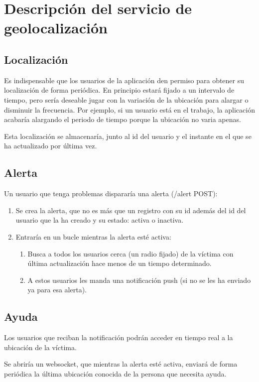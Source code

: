 \chapter{Descripción del servicio de geolocalización}

\section{Localización}
Es indispensable que los usuarios de la aplicación den permiso para obtener su localización de forma periódica. En principio estará fijado a un intervalo de tiempo, pero sería deseable 
jugar con la variación de la ubicación para alargar o disminuir la frecuencia. Por ejemplo, si un usuario está en el trabajo, la aplicación acabaría alargando el periodo de tiempo porque la ubicación no varia apenas. 

Esta localización se almacenaría, junto al id del usuario y el instante en el que se ha actualizado por última vez.

\section{Alerta}

Un usuario que tenga problemas dispararía una alerta (/alert POST):

\begin{enumerate}
  \item Se crea la alerta, que no es más que un registro con su id además del id del usuario que la ha creado y su estado: activa o inactiva.
  \item Entraría en un bucle mientras la alerta esté activa:
  \begin{enumerate}
    \item Busca a todos los usuarios cerca (un radio fijado) de la víctima con última actualización hace menos de un tiempo determinado.
    \item A estos usuarios les manda una notificación push (si no se les ha enviado ya para esa alerta).
  \end{enumerate}
\end{enumerate}


\section{Ayuda}

Los usuarios que reciban la notificación podrán acceder en tiempo real a la ubicación de la víctima.

Se abriría un websocket, que mientras la alerta esté activa, enviará de forma periódica la última ubicación conocida de la persona que necesita ayuda.
